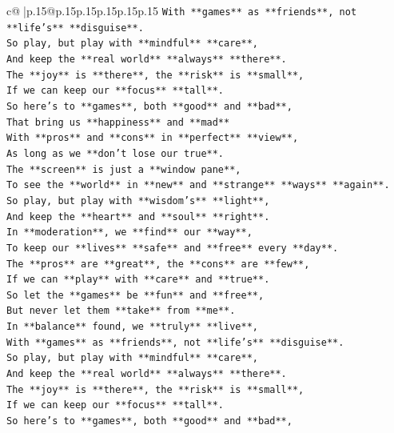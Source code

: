 \documentclass{article}
\begin{document}
{\begin{supertabular}{c@{$\;$}|p{.15\linewidth}@{}p{.15\linewidth}p{.15\linewidth}p{.15\linewidth}p{.15\linewidth}p{.15\linewidth}}
{{{\texttt{With **games** as **friends**, not **life's** **disguise**.} \\
\texttt{So play, but play with **mindful** **care**,} \\
\texttt{And keep the **real world** **always** **there**.} \\
\texttt{The **joy** is **there**, the **risk** is **small**,} \\
\texttt{If we can keep our **focus** **tall**.} \\
\texttt{So here's to **games**, both **good** and **bad**,} \\
\texttt{That bring us **happiness** and **mad**} \\
\texttt{With **pros** and **cons** in **perfect** **view**,} \\
\texttt{As long as we **don't lose our true**.} \\
\texttt{The **screen** is just a **window pane**,} \\
\texttt{To see the **world** in **new** and **strange** **ways** **again**.} \\
\texttt{So play, but play with **wisdom's** **light**,} \\
\texttt{And keep the **heart** and **soul** **right**.} \\
\texttt{In **moderation**, we **find** our **way**,} \\
\texttt{To keep our **lives** **safe** and **free** every **day**.} \\
\texttt{The **pros** are **great**, the **cons** are **few**,} \\
\texttt{If we can **play** with **care** and **true**.} \\
\texttt{So let the **games** be **fun** and **free**,} \\
\texttt{But never let them **take** from **me**.} \\
\texttt{In **balance** found, we **truly** **live**,} \\
\texttt{With **games** as **friends**, not **life's** **disguise**.} \\
\texttt{So play, but play with **mindful** **care**,} \\
\texttt{And keep the **real world** **always** **there**.} \\
\texttt{The **joy** is **there**, the **risk** is **small**,} \\
\texttt{If we can keep our **focus** **tall**.} \\
\texttt{So here's to **games**, both **good** and **bad**,} \\
}}}
\end{supertabular}}
\end{document}
